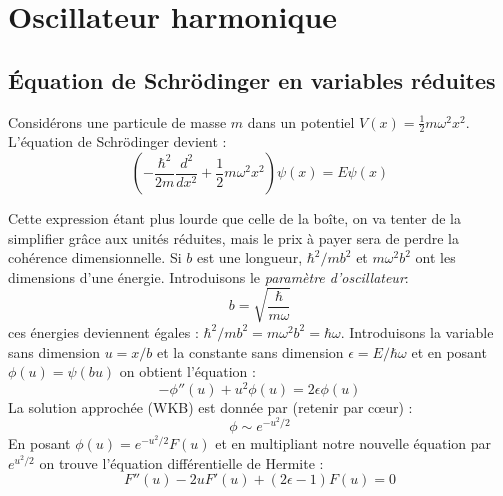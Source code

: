 \documentclass[british,french,11pt, a4paper, openany]{book}
\begin{document}
	
	\section{Oscillateur harmonique}
	\subsection{Équation de Schrödinger en variables réduites}
	Considérons une particule de masse $m$ dans un potentiel $V(x) = \frac{1}{2}m\omega^2x^2$. L'équation de Schrödinger devient :
	\begin{equation}
		\left(-\frac{\hbar^2}{2m}\frac{d^2}{dx^2} + \frac{1}{2}m\omega^2x^2\right)\psi(x) = E\psi(x)
	\end{equation}
	
	Cette expression étant plus lourde que celle de la boîte, on va tenter de la simplifier grâce aux unités réduites, mais le prix à payer sera de perdre la cohérence dimensionnelle. Si $b$ est une longueur, $\hbar^2/mb^2$ et $m\omega^2b^2$ ont les dimensions d'une énergie.  Introduisons le \textit{paramètre d'oscillateur}:
	\begin{equation}
		b = \sqrt{\dfrac{\hbar}{m\omega}}
	\end{equation}
	ces énergies deviennent égales : $\hbar^2/mb^2 = m\omega^2b^2 = \hbar\omega$. Introduisons la variable sans dimension $u = x/b$ et la constante sans dimension $\epsilon = E/\hbar\omega$ et en posant $\phi(u) = \psi(bu)$ on obtient l'équation :
	\begin{equation}
		-\phi''(u) + u^2\phi(u) = 2\epsilon\phi(u)
	\end{equation}
	La solution approchée (WKB) est donnée par (retenir par cœur) :
	\begin{equation}
		\phi \sim e^{-u^2/2}
	\end{equation}
	En posant $\phi(u) = e^{-u^2/2}F(u)$ et en multipliant notre nouvelle équation par $e^{u^2/2}$ on trouve l'équation différentielle de Hermite :
	\begin{equation}
		F''(u) - 2uF'(u) + (2\epsilon - 1)F(u) = 0
	\end{equation}
	
\end{document}
